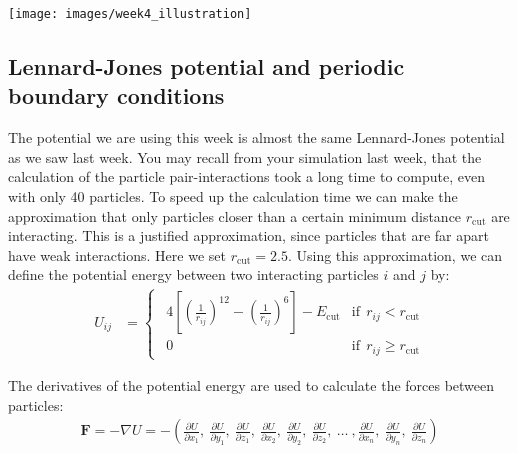 \documentclass{article}
\begin{document}
\begin{center}
\texttt{[image: images/week4\_illustration]}
\end{center}

\subsection{Lennard-Jones potential and periodic boundary conditions}

The potential we are using this week is almost the same Lennard-Jones potential as we saw last week.
You may recall from your simulation last week, that the calculation of the particle pair-interactions took a long time to compute, even with only 40 particles.
%
To speed up the calculation time we can make the approximation that only particles closer than a certain minimum distance $r_{\mathrm{cut}}$ are interacting.
This is a justified approximation, since particles that are far apart have weak interactions.
Here we set $r_{\mathrm{cut}} = 2.5$.
Using this approximation, we can define the potential energy between two interacting particles $i$ and $j$ by:
%
\begin{align}
    U_{ij} &= 
    \begin{cases}
        \ \ 4 \left[ \left(\frac{1}{r_{ij}} \right)^{12} - \left(\frac{1}{r_{ij}} \right)^6 \right] -E_{\mathrm{cut}} & \mathrm{if}\ \ r_{ij} < r_{\mathrm{cut}}\\
        \ \ 0 & \mathrm{if}\ \ r_{ij} \ge  r_{\mathrm{cut}}
    \end{cases}
\end{align}

The derivatives of the potential energy are used to calculate the forces between particles:
\begin{align}
    \mathbf{F} = -\nabla U =
    -\left(
        \frac{\partial U}{\partial x_1},\
        \frac{\partial U}{\partial y_1},\
        \frac{\partial U}{\partial z_1},\
        \frac{\partial U}{\partial x_2},\
        \frac{\partial U}{\partial y_2},\
        \frac{\partial U}{\partial z_2},\
        \ldots\ ,
        \frac{\partial U}{\partial x_n},\
        \frac{\partial U}{\partial y_n},\
        \frac{\partial U}{\partial z_n}
    \right)
\end{align}
\end{document}
